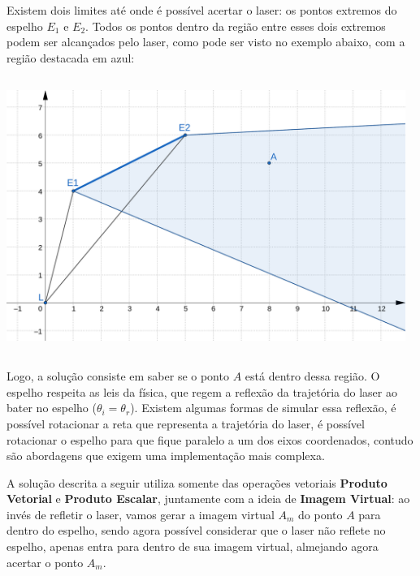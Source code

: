 Existem dois limites até onde é possível acertar o laser: os pontos extremos do espelho $E_1$ e $E_2$. Todos os pontos dentro da região entre esses dois extremos podem ser alcançados pelo laser, como pode ser visto no exemplo abaixo, com a região destacada em azul:

\begin{center}
\includegraphics[width=13cm, height=9cm]{tutorial1.png}
\end{center}

Logo, a solução consiste em saber se o ponto $A$ está dentro dessa região. O espelho respeita as leis da física, que regem a reflexão da trajetória do laser ao bater no espelho ($\theta_i = \theta_r$). Existem algumas formas de simular essa reflexão, é possível rotacionar a reta que representa a trajetória do laser, é possível rotacionar o espelho para que fique paralelo a um dos eixos coordenados, contudo são abordagens que exigem uma implementação mais complexa.

A solução descrita a seguir utiliza somente das operações vetoriais \textbf{Produto Vetorial} e \textbf{Produto Escalar}, juntamente com a ideia de \textbf{Imagem Virtual}: ao invés de refletir o laser, vamos gerar a imagem virtual $A_m$ do ponto $A$ para dentro do espelho, sendo agora possível considerar que o laser não reflete no espelho, apenas entra para dentro de sua imagem virtual, almejando agora acertar o ponto $A_m$.

